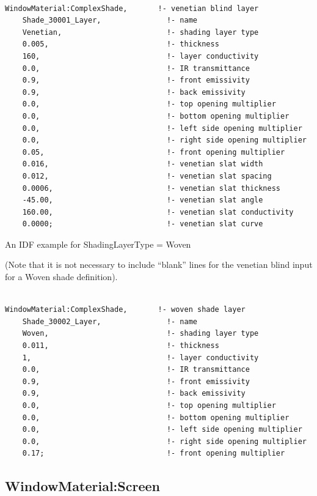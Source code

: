 \begin{lstlisting}

WindowMaterial:ComplexShade,       !- venetian blind layer
    Shade_30001_Layer,               !- name
    Venetian,                        !- shading layer type
    0.005,                           !- thickness
    160,                             !- layer conductivity
    0.0,                             !- IR transmittance
    0.9,                             !- front emissivity
    0.9,                             !- back emissivity
    0.0,                             !- top opening multiplier
    0.0,                             !- bottom opening multiplier
    0.0,                             !- left side opening multiplier
    0.0,                             !- right side opening multiplier
    0.05,                            !- front opening multiplier
    0.016,                           !- venetian slat width
    0.012,                           !- venetian slat spacing
    0.0006,                          !- venetian slat thickness
    -45.00,                          !- venetian slat angle
    160.00,                          !- venetian slat conductivity
    0.0000;                          !- venetian slat curve
\end{lstlisting}

An IDF example for ShadingLayerType = Woven

(Note that it is not necessary to include ``blank'' lines for the venetian blind input for a Woven shade definition).

\begin{lstlisting}

WindowMaterial:ComplexShade,       !- woven shade layer
    Shade_30002_Layer,               !- name
    Woven,                           !- shading layer type
    0.011,                           !- thickness
    1,                               !- layer conductivity
    0.0,                             !- IR transmittance
    0.9,                             !- front emissivity
    0.9,                             !- back emissivity
    0.0,                             !- top opening multiplier
    0.0,                             !- bottom opening multiplier
    0.0,                             !- left side opening multiplier
    0.0,                             !- right side opening multiplier
    0.17;                            !- front opening multiplier
\end{lstlisting}

\subsection{WindowMaterial:Screen}\label{windowmaterialscreen}

